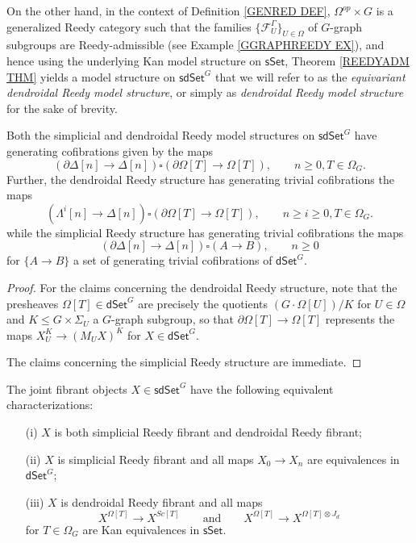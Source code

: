 \documentclass[a4paper,10p,draft]{article}%
\numberwithin{equation}{section}%
\begin{document}
On the other hand, in the context of Definition \ref{GENRED DEF},
$\Omega^{op} \times G$ is a generalized Reedy category such that the families $\{\mathcal{F}_{U}^{\Gamma}\}_{U \in \Omega}$
of $G$-graph subgroups are Reedy-admissible 
(see Example \ref{GGRAPHREEDY EX}), 
and hence using the underlying 
Kan model structure on $\mathsf{sSet}$, 
Theorem \ref{REEDYADM THM} yields
a model structure on $\mathsf{sdSet}^G$
that we will refer to as the \textit{equivariant dendroidal Reedy model structure}, 
or simply as \textit{dendroidal Reedy model structure} for the sake of brevity.

\begin{proposition}
	Both the simplicial and dendroidal Reedy model structures on 
	$\mathsf{sdSet}^G$ have generating cofibrations given by the maps
\[
	\left(\partial \Delta [n] \to \Delta[n]\right)
		\square
	\left(\partial \Omega[T] \to \Omega[T]\right),
	\qquad
	n\geq 0, T \in \Omega_G.
\]
Further, the dendroidal Reedy structure has generating trivial cofibrations the maps
\begin{equation}\label{DENDTRIVCOF EQ}
	\left(\Lambda^i [n] \to \Delta[n]\right)
		\square
	\left(\partial \Omega[T] \to \Omega[T]\right),
	\qquad
	n\geq i \geq 0, T \in \Omega_G.
\end{equation}
while the simplicial Reedy structure has generating trivial cofibrations the maps
\begin{equation}\label{SIMPTRIVCOF EQ}
	\left(\partial \Delta [n] \to \Delta[n]\right)
		\square
	\left(A \to B\right),
	\qquad
	n\geq 0
\end{equation}
for $\{A \to B\}$ a set of generating trivial cofibrations of
$\mathsf{dSet}^G$.
\end{proposition}

\begin{proof}
	For the claims concerning the dendroidal Reedy structure, 
	note that the presheaves $\Omega[T] \in \mathsf{dSet}^G$
	are precisely the quotients $(G \cdot \Omega[U])/K$ for $U\in \Omega$ and $K \leq G \times \Sigma_U$ a $G$-graph subgroup,
	so that $\partial \Omega[T] \to \Omega[T]$
	represents the maps $X_U^K \to (M_U X)^K$ for $X \in \mathsf{dSet}^G$.
	
	The claims concerning the simplicial Reedy structure are immediate.
\end{proof}


\begin{corollary}\label{JOINTFIBCHAR COR}
The joint fibrant objects $X \in \mathsf{sdSet}^G$ have the following equivalent characterizations:
\begin{itemize}
	\item[(i)] $X$ is both simplicial Reedy fibrant and dendroidal Reedy fibrant;
	\item[(ii)] $X$ is simplicial Reedy fibrant and all maps 
	$X_0 \to X_n$ are equivalences in $\mathsf{dSet}^{G}$;
	\item[(iii)] $X$ is dendroidal Reedy fibrant and all maps
\[
	X^{\Omega[T]} \to X^{Sc[T]}
\qquad \text{and} \qquad
	X^{\Omega[T]} \to X^{\Omega[T]\otimes J_d}
\]
for $T \in \Omega_G$ are Kan equivalences in $\mathsf{sSet}$.
\end{itemize}
\end{corollary}
\end{document}
